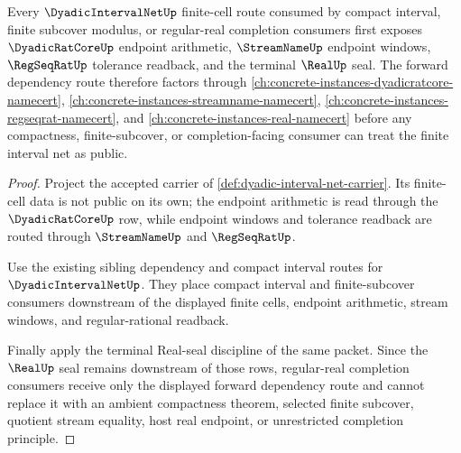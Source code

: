 \begin{theorem}
\label{thm:dyadic-interval-net-forward-dependency-route}
Every $\DyadicIntervalNetUp$ finite-cell route consumed by compact interval, finite subcover modulus, or regular-real completion consumers first exposes $\DyadicRatCoreUp$ endpoint arithmetic, $\StreamNameUp$ endpoint windows, $\RegSeqRatUp$ tolerance readback, and the terminal $\RealUp$ seal. The forward dependency route therefore factors through \autoref{ch:concrete-instances-dyadicratcore-namecert}, \autoref{ch:concrete-instances-streamname-namecert}, \autoref{ch:concrete-instances-regseqrat-namecert}, and \autoref{ch:concrete-instances-real-namecert} before any compactness, finite-subcover, or completion-facing consumer can treat the finite interval net as public.
\end{theorem}
\begin{proof}
Project the accepted carrier of \autoref{def:dyadic-interval-net-carrier}. Its finite-cell data is not public on its own; the endpoint arithmetic is read through the $\DyadicRatCoreUp$ row, while endpoint windows and tolerance readback are routed through $\StreamNameUp$ and $\RegSeqRatUp$.

Use the existing sibling dependency and compact interval routes for $\DyadicIntervalNetUp$. They place compact interval and finite-subcover consumers downstream of the displayed finite cells, endpoint arithmetic, stream windows, and regular-rational readback.

Finally apply the terminal Real-seal discipline of the same packet. Since the $\RealUp$ seal remains downstream of those rows, regular-real completion consumers receive only the displayed forward dependency route and cannot replace it with an ambient compactness theorem, selected finite subcover, quotient stream equality, host real endpoint, or unrestricted completion principle.
\end{proof}
